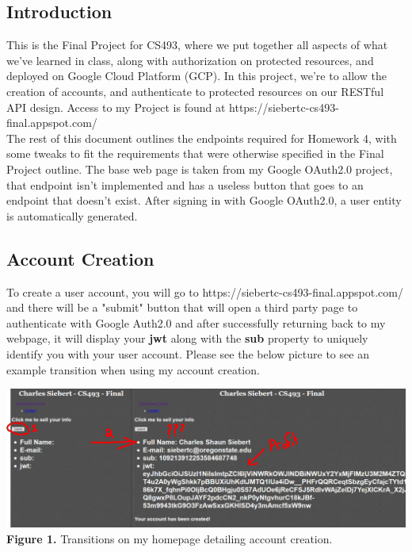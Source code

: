 \documentclass[letterpaper,11pt,titlepage,draftclsnofoot,onecolumn,compsoc,utf8,latin1]{IEEEtran}
\begin{document}
\begin{singlespace}

\section{Introduction}
This is the Final Project for CS493, where we put together all aspects of what we've learned in class, along with authorization on protected resources, and deployed on Google Cloud Platform (GCP). In this project, we're to allow the creation of accounts, and authenticate to protected resources on our RESTful API design. Access to my Project is found at https://siebertc-cs493-final.appspot.com/ \\

\noindent
The rest of this document outlines the endpoints required for Homework 4, with some tweaks to fit the requirements that were otherwise specified in the Final Project outline. The base web page is taken from my Google OAuth2.0 project, that endpoint isn't implemented and has a useless button that goes to an endpoint that doesn't exist. After signing in with Google OAuth2.0, a user entity is automatically generated.

\subsection{Account Creation}
To create a user account, you will go to https://siebertc-cs493-final.appspot.com/ and there will be a "submit" button that will open a third party page to authenticate with Google Auth2.0 and after successfully returning back to my webpage, it will display your \textbf{jwt} along with the \textbf{sub} property to uniquely identify you with your user account. Please see the below picture to see an example transition when using my account creation.

\begin{center}
\includegraphics[width=\textwidth]{accountcreation.JPG}\\
\caption{\textbf{Figure 1. } Transitions on my homepage detailing account creation.}\\
\end{center}


\end{singlespace}
\end{document}
